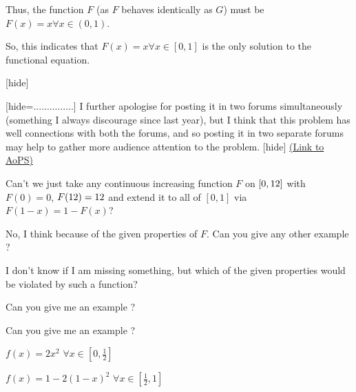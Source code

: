 \begin{problem}
Thus, the function $F$ (as $F$ behaves identically as $G$) must be $F(x)=x \forall x \in (0,1)$. 

So, this indicates that $\boxed{F(x)=x \forall x \in [0,1]}$ is the only solution to the functional equation. 

[\/hide]

[hide=...............]
I further apologise for posting it in two forums simultaneously (something I always discourage since last year), but I think that this problem has well connections with both the forums, and so posting it in two separate forums may help to gather more audience attention to the problem. 
[\/hide]
	\flushright \href{https://artofproblemsolving.com/community/c6h1601617}{(Link to AoPS)}
\end{problem}



\begin{solution}
	Can't we just take any continuous increasing function $F$ on $[0, 1\/2]$ with $F(0)=0$, $F(1\/2)=1\/2$ and extend it to all of $[0,1]$ via $F(1-x)=1-F(x)$?
\end{solution}



\begin{solution}
	No, I think because of  the given properties of $F$. 
Can you give any other example ?
\end{solution}



\begin{solution}
	I don't know if I am missing something, but which of the given properties would be violated by such a function?
\end{solution}



\begin{solution}
	Can you give me an example ?
\end{solution}



\begin{solution}
	\begin{tcolorbox}Can you give me an example ?\end{tcolorbox}
$f(x)=2x^2$ $\forall x\in[0,\frac 12]$

$f(x)=1-2(1-x)^2$ $\forall x\in[\frac 12,1]$



\end{solution}



